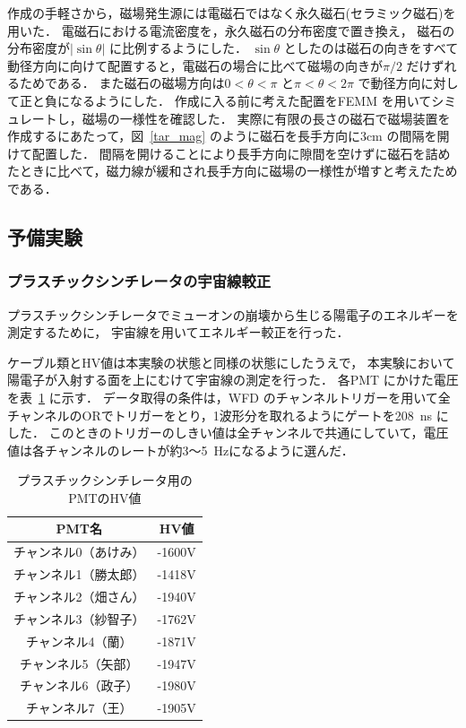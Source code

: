 作成の手軽さから，磁場発生源には電磁石ではなく永久磁石(セラミック磁石)を用いた．
電磁石における電流密度を，永久磁石の分布密度で置き換え，
磁石の分布密度が$|\sin\theta|$ に比例するようにした．
$\sin\theta$ としたのは磁石の向きをすべて動径方向に向けて配置すると，電磁石の場合に比べて磁場の向きが$\pi/2$ だけずれるためである．
また磁石の磁場方向は$0<\theta<\pi$ と$\pi<\theta<2\pi$ で動径方向に対して正と負になるようにした．
作成に入る前に考えた配置をFEMM を用いてシミュレートし，磁場の一様性を確認した．
実際に有限の長さの磁石で磁場装置を作成するにあたって，図~\ref{tar_mag} のように磁石を長手方向に$3\mathrm{cm}$ の間隔を開けて配置した．
間隔を開けることにより長手方向に隙間を空けずに磁石を詰めたときに比べて，磁力線が緩和され長手方向に磁場の一様性が増すと考えたためである．

\newpage
\subsection{予備実験}
\subsubsection{プラスチックシンチレータの宇宙線較正}
プラスチックシンチレータでミューオンの崩壊から生じる陽電子のエネルギーを測定するために， 宇宙線を用いてエネルギー較正を行った．

ケーブル類とHV値は本実験の状態と同様の状態にしたうえで，
本実験において陽電子が入射する面を上にむけて宇宙線の測定を行った．
各PMT にかけた電圧を表~\ref{PS_PMT_HV} に示す．
データ取得の条件は，WFD のチャンネルトリガーを用いて全チャンネルのORでトリガーをとり，1波形分を取れるようにゲートを208~ns にした．
このときのトリガーのしきい値は全チャンネルで共通にしていて，電圧値は各チャンネルのレートが約3〜5~Hzになるように選んだ．
 \begin{table}[H]
  \caption{プラスチックシンチレータ用のPMTのHV値}
  \label{PS_PMT_HV}
  \begin{center}
   \begin{tabular}{cc}\toprule
    PMT名&HV値 \\ \hline
    チャンネル0（あけみ）&-1600V \\
    チャンネル1（勝太郎）&-1418V \\
    チャンネル2（畑さん）&-1940V \\
    チャンネル3（紗智子）&-1762V \\
    チャンネル4（蘭）  &-1871V \\
    チャンネル5（矢部） &-1947V \\
    チャンネル6（政子） &-1980V \\
    チャンネル7（王）  &-1905V \\ \bottomrule
   \end{tabular} 
  \end{center}
 \end{table}%

